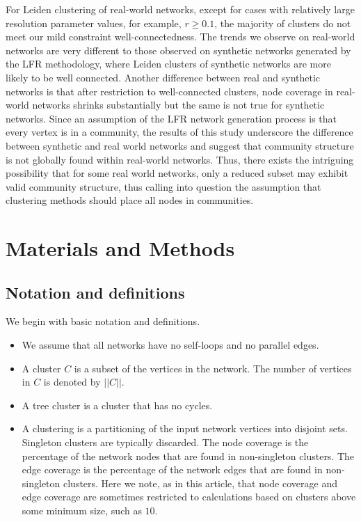 \documentclass[11pt]{article}   	%
\begin{document}
For Leiden clustering of real-world networks, except for cases with relatively large resolution parameter values, for example, $r \geq 0.1$, the majority of clusters do not meet our mild constraint well-connectedness.
The trends we observe on real-world networks are very different to those observed on synthetic networks   generated by the LFR methodology, where Leiden clusters of
synthetic networks are more likely to be well connected. Another difference between real and synthetic networks is that after restriction to well-connected clusters, node coverage in real-world networks shrinks substantially but the same is not true for synthetic networks.  Since an assumption of the LFR network generation process  is that every vertex  is in a community, the results of this study
underscore the difference between synthetic and real world networks and suggest that community structure is not globally found within real-world networks.
Thus, there exists the intriguing possibility that for some  real world networks, only a reduced subset may exhibit valid community structure,
thus calling into question the assumption that  clustering methods should place all nodes in communities.


\section{Materials and Methods}

\subsection{Notation and definitions}
We begin with basic notation and definitions.
\begin{itemize}
\item We assume that all networks have no self-loops and no parallel edges.
\item A cluster $C$ is a subset of the vertices in the network. The number of vertices in $C$ is denoted by $||C||$.
\item A tree cluster is a cluster that has no cycles.
\item A clustering is a partitioning of the input network vertices into disjoint sets.  Singleton clusters are typically
discarded.  The node coverage is the percentage of the network nodes that are found in non-singleton clusters.
The edge coverage is the percentage of the network edges that are found in non-singleton clusters. Here we note, as in this article, that 
node coverage and edge coverage are sometimes restricted to calculations based on clusters above some minimum size, such as $10$.
\end{itemize}
\end{document}
